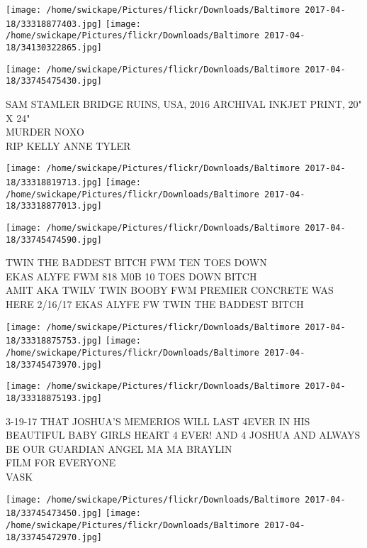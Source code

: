 \documentclass[10pt,letterpaper]{article}
\begin{document}
\texttt{[image: /home/swickape/Pictures/flickr/Downloads/Baltimore 2017-04-18/33318877403.jpg]}
\texttt{[image: /home/swickape/Pictures/flickr/Downloads/Baltimore 2017-04-18/34130322865.jpg]}

\vspace{0.25in}
\texttt{[image: /home/swickape/Pictures/flickr/Downloads/Baltimore 2017-04-18/33745475430.jpg]}

SAM STAMLER BRIDGE RUINS, USA, 2016 ARCHIVAL INKJET PRINT, 20" X 24"\\
MURDER NOXO\\
RIP KELLY ANNE TYLER\\
\pagebreak

\texttt{[image: /home/swickape/Pictures/flickr/Downloads/Baltimore 2017-04-18/33318819713.jpg]}
\texttt{[image: /home/swickape/Pictures/flickr/Downloads/Baltimore 2017-04-18/33318877013.jpg]}

\vspace{0.25in}
\texttt{[image: /home/swickape/Pictures/flickr/Downloads/Baltimore 2017-04-18/33745474590.jpg]}

TWIN THE BADDEST BITCH FWM TEN TOES DOWN\\
EKAS ALYFE FWM 818 M0B 10 TOES DOWN BITCH\\
AMIT AKA TWILV TWIN BOOBY FWM PREMIER CONCRETE WAS HERE 2/16/17 EKAS ALYFE FW TWIN THE BADDEST BITCH\\
\pagebreak

\texttt{[image: /home/swickape/Pictures/flickr/Downloads/Baltimore 2017-04-18/33318875753.jpg]}
\texttt{[image: /home/swickape/Pictures/flickr/Downloads/Baltimore 2017-04-18/33745473970.jpg]}

\vspace{0.25in}
\texttt{[image: /home/swickape/Pictures/flickr/Downloads/Baltimore 2017-04-18/33318875193.jpg]}

3{-}19{-}17 THAT JOSHUA'S MEMERIOS WILL LAST 4EVER IN HIS BEAUTIFUL BABY GIRLS HEART 4 EVER!  AND 4 JOSHUA AND ALWAYS BE OUR GUARDIAN ANGEL MA MA BRAYLIN\\
FILM FOR EVERYONE\\
VASK\\
\pagebreak

\texttt{[image: /home/swickape/Pictures/flickr/Downloads/Baltimore 2017-04-18/33745473450.jpg]}
\texttt{[image: /home/swickape/Pictures/flickr/Downloads/Baltimore 2017-04-18/33745472970.jpg]}
\end{document}
